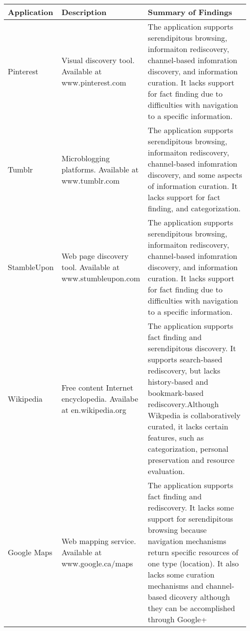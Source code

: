 \documentclass{casconpaper}
\begin{document}
{\begin{table*}[htbp]
\begin{tabular}{|p{0.11\linewidth}| p{0.22\linewidth}| p{0.66\linewidth}|}
\hline
Application     & Description                                                                  & Summary of Findings                                                                                                                                                                                                                                                                                            
\\
\hline
Pinterest       & \raggedright
Visual discovery tool. Available at www.pinterest.com                        & The application supports serendipitous browsing, informaiton rediscovery, channel-based infomration discovery, and information curation. It lacks support for fact finding due to difficulties with navigation to a specific information.                                                                       \\
\hline
Tumblr          & \raggedright Microblogging platforms. Available at www.tumblr.com                         & The application supports serendipitous browsing, informaiton rediscovery, channel-based infomration discovery, and some aspects of information curation. It lacks support for fact finding, and categorization.                                                                                                 \\
\hline
StambleUpon     & \raggedright Web page discovery tool. Available at www.stumbleupon.com                    & The application supports serendipitous browsing, informaiton rediscovery, channel-based infomration discovery, and information curation. It lacks support for fact finding due to difficulties with navigation to a specific information.                                                                       \\
\hline
Wikipedia       & \raggedright Free content Internet encyclopedia. Availabe at en.wikipedia.org             & The application supports fact finding and serendipitous discovery. It supports search-based rediscovery, but lacks history-based and bookmark-based rediscovery.Although Wikpedia is collaboratively curated, it lacks certain features, such as categorization, personal preservation and resource evaluation. \\
\hline
Google Maps     & \raggedright Web mapping service. Available at www.google.ca/maps                         & The application supports fact finding and rediscovery. It lacks some support for serendipitous browsing because navigation mechanisms return specific resources of one type (location).  It also lacks some curation mechanisms and channel-based dicovery although they can be accomplished through Google+    \\

\end{tabular}
\end{table*}}
\end{document}
